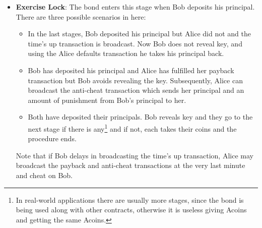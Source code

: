 \begin{itemize}
    \item \textbf{Exercise Lock}: The bond enters this stage when Bob deposits his principal. There are three possible scenarios in here:
    \begin{itemize}
        \item In the last stages, Bob deposited his principal but Alice did not and the time's up transaction is broadcast. Now Bob does not reveal \keyone key, and using the Alice defaults transaction he takes his principal back.
        
        \item Bob has deposited his principal and Alice has fulfilled her payback transaction but Bob avoids revealing the \keyone key. Subsequently, Alice can broadcast the anti-cheat transaction which sends her principal and an amount of punishment from Bob's principal to her. 
        
        \item Both have deposited their principals. Bob reveals \keyone key and they go to the next stage if there is any\footnote{In real-world applications there are usually more stages, since the bond is being used along with other contracts, otherwise it is useless giving Acoins and getting the same Acoins.} and if not, each takes their coins and the procedure ends.
    \end{itemize}

    Note that if Bob delays in broadcasting the time's up transaction, Alice may broadcast the payback and anti-cheat transactions at the very last minute and cheat on Bob.

\end{itemize}